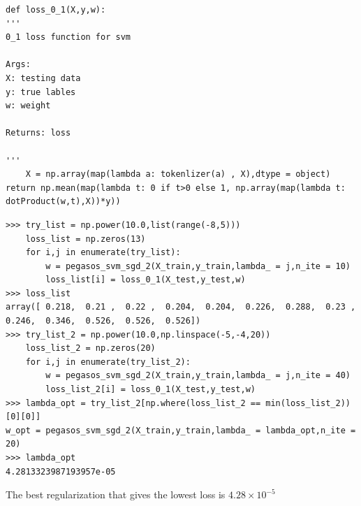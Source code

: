 \documentclass{article}
\newenvironment{problem}[2][$\bullet$]{\begin{trivlist}\large
		\item[\hskip \labelsep {\bfseries #1}\hskip \labelsep {\bfseries #2.}]}  {\end{trivlist}}
\begin{document}
\begin{problem}{6.5}
	\end{problem}
\begin{verbatim}
def loss_0_1(X,y,w):
'''
0_1 loss function for svm

Args:
X: testing data
y: true lables
w: weight

Returns: loss

'''
	X = np.array(map(lambda a: tokenlizer(a) , X),dtype = object)
return np.mean(map(lambda t: 0 if t>0 else 1, np.array(map(lambda t: dotProduct(w,t),X))*y))

\end{verbatim}

\begin{problem}{6.6}
\end{problem}

\begin{verbatim}
>>> try_list = np.power(10.0,list(range(-8,5)))
    loss_list = np.zeros(13)
    for i,j in enumerate(try_list):
	    w = pegasos_svm_sgd_2(X_train,y_train,lambda_ = j,n_ite = 10)
	    loss_list[i] = loss_0_1(X_test,y_test,w)
>>> loss_list
array([ 0.218,  0.21 ,  0.22 ,  0.204,  0.204,  0.226,  0.288,  0.23 ,
0.246,  0.346,  0.526,  0.526,  0.526])
>>> try_list_2 = np.power(10.0,np.linspace(-5,-4,20))
    loss_list_2 = np.zeros(20)
    for i,j in enumerate(try_list_2):
	    w = pegasos_svm_sgd_2(X_train,y_train,lambda_ = j,n_ite = 40)
	    loss_list_2[i] = loss_0_1(X_test,y_test,w)
>>> lambda_opt = try_list_2[np.where(loss_list_2 == min(loss_list_2))[0][0]]
w_opt = pegasos_svm_sgd_2(X_train,y_train,lambda_ = lambda_opt,n_ite = 20)
>>> lambda_opt
4.2813323987193957e-05
\end{verbatim}

The best regularization that gives the lowest loss is $4.28 \times 10^{-5}$

\pagebreak
\end{document}
